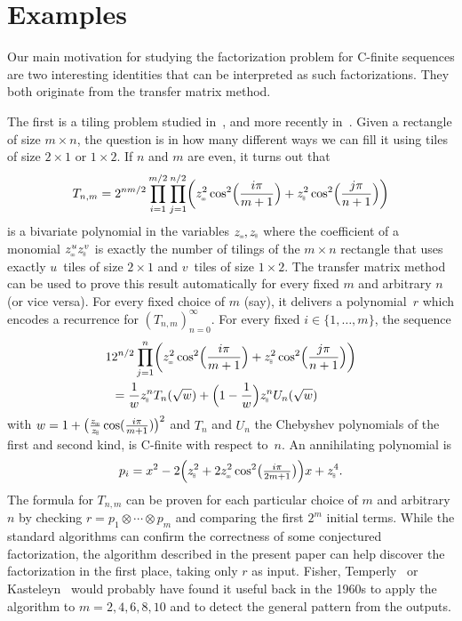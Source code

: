 \documentclass{sig-alternate}
\begin{document}
\section{Examples}

Our main motivation for studying the factorization problem for C-finite sequences
are two interesting identities that can be interpreted as such factorizations. They
both originate from the transfer matrix method.

\def\-{{\tikz[x=1.5pt,y=1.5pt]\draw[very thin](0,0) rectangle (1,1) (1,0) rectangle (2,1);}}
\def\|{{\tikz[x=1.5pt,y=1.5pt]\draw[very thin](0,0) rectangle (1,1) (0,1) rectangle (1,2);}}

The first is a tiling problem studied in~\cite{kasteleyn61,fisher61}, and more recently in~\cite{zeilberger06a}.
Given a rectangle of size $m\times n$, the question is
in how many different ways we can fill it using tiles of size $2\times 1$ or $1\times 2$.
If $n$ and $m$ are even, it turns out that
\[
 T_{n,m} = 2^{nm/2}\prod_{i=1}^{m/2}\prod_{j=1}^{n/2}\biggl(z_\-^2\cos^2\Bigl(\frac{i\pi}{m+1}\Bigr)+z_\|^2\cos^2\Bigl(\frac{j\pi}{n+1}\Bigr)\biggr)
\]
is a bivariate polynomial in the variables $z_\-,z_\|$ where the coefficient of a monomial $z_\-^uz_\|^v$ is exactly
the number of tilings of the $m\times n$ rectangle that uses exactly $u$~tiles of size $2\times 1$
and $v$~tiles of size $1\times 2$. 
The transfer matrix method can be used to prove this result automatically for every fixed
$m$ and arbitrary $n$ (or vice versa). For every fixed choice of $m$ (say), it delivers
a polynomial~$r$ which encodes a recurrence for $(T_{n,m})_{n=0}^\infty$. For every fixed $i\in\{1,\dots,m\}$,
the sequence
\begin{alignat*}1
  &2^{n/2}\prod_{j=1}^n\biggl(z_\-^2\cos^2\Bigl(\frac{i\pi}{m+1}\Bigr)+z_\|^2\cos^2\Bigl(\frac{j\pi}{n+1}\Bigr)\biggr)\\
  &{}= \frac1wz_\|^n T_n(\sqrt w) + \Bigl(1-\frac1w\Bigr)z_\|^n U_n(\sqrt w)
\end{alignat*}
with $w=1+\bigl(\frac{z_\-}{z_\|}\cos(\frac{i\pi}{m+1})\bigr)^2$ and $T_n$ and $U_n$ the Chebyshev polynomials
of the first and second kind, 
is C-finite with respect to~$n$. An annihilating polynomial is
\[
 p_i = x^2 - 2 \Bigl(z_\|^2 + 2 z_\-^2\cos^2\bigl(\tfrac{i\pi}{2m+1}\bigr)\Bigr)x + z_\|^4. 
\]
The formula for $T_{n,m}$ can be proven for each particular choice of $m$ and arbitrary $n$ by checking
$r=p_1\otimes\cdots\otimes p_m$ and comparing the first $2^m$ initial terms.
While the standard algorithms can confirm the correctness of some conjectured
factorization, the algorithm described in the present paper can
help discover the factorization in the first place, taking only $r$ as input.
Fisher, Temperly~\cite{fisher61} or Kasteleyn~\cite{kasteleyn61} would probably
have found it useful back in the 1960s to apply the algorithm to $m=2,4,6,8,10$
and to detect the general pattern from the outputs.
\end{document}
